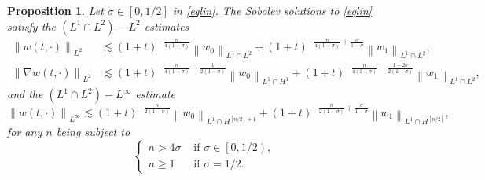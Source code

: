 \documentclass[11pt,reqno]{amsart}
\numberwithin{equation}{section}
\newtheorem{proposition}[theorem]{Proposition}
\theoremstyle{plain}
\begin{document}
\begin{proposition}\label{prop2.1} Let $\sigma \in\left[0, 1/2\right]$ in \eqref{eqlin}. The Sobolev solutions to \eqref{eqlin} satisfy the $\left(L^1 \cap L^2\right)-L^2$ estimates
\begin{align}
\left\|w(t, \cdot)\right\|_{L^2} &\lesssim(1+t)^{-\frac{n}{4(1-\sigma)}}\left\|w_0\right\|_{L^1 \cap L^2}+(1+t)^{-\frac{n}{4(1-\sigma)}+\frac{\sigma}{1-\sigma}}\left\|w_1\right\|_{L^1 \cap L^2}, \label{eq1prop2.1} \\
\left\|\nabla w(t, \cdot)\right\|_{L^2} &\lesssim(1+t)^{-\frac{n}{4(1-\sigma)}-\frac{1}{2(1-\sigma)}}\left\|w_0\right\|_{L^1 \cap H^1}+(1+t)^{-\frac{n}{4(1-\sigma)}-\frac{1-2\sigma}{2(1-\sigma)}}\left\|w_1\right\|_{L^1 \cap L^2}, \label{eq2prop2.1}
\end{align}
and the $(L^1\cap L^2)-L^{\infty}$ estimate
\begin{equation}\label{eq3prop2.1}
\left\|w(t, \cdot)\right\|_{L^\infty} \lesssim(1+t)^{-\frac{n}{2(1-\sigma)}}\left\|w_0\right\|_{L^1 \cap H^{[n/2]+1}}+(1+t)^{-\frac{n}{2(1-\sigma)}+\frac{\sigma}{1-\sigma}}\left\|w_1\right\|_{L^1 \cap H^{[n/2]}},
\end{equation}
for any $n$ being subject to
\[
\begin{cases}
    n>4\sigma &\text{ if }\sigma\in \left[0,1/2\right), \\
    n\geq 1 &\text{ if }\sigma=1/2.
\end{cases}
\]
\end{proposition}
\end{document}
